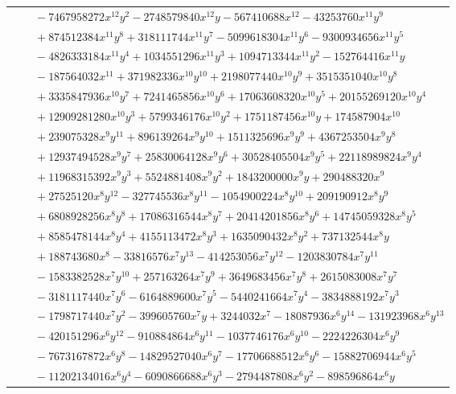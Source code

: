 \documentclass[11pt]{article}
\begin{document}
\begin{longtable}{@{}ll@{}}
 & $\quad -7467958272x^{12}y^{2}-2748579840x^{12}y-567410688x^{12}-43253760x^{11}y^{9}$\\
 & $\quad +874512384x^{11}y^{8}+318111744x^{11}y^{7}-5099618304x^{11}y^{6}-9300934656x^{11}y^{5}$\\
 & $\quad -4826333184x^{11}y^{4}+1034551296x^{11}y^{3}+1094713344x^{11}y^{2}-152764416x^{11}y$\\
 & $\quad -187564032x^{11}+371982336x^{10}y^{10}+2198077440x^{10}y^{9}+3515351040x^{10}y^{8}$\\
 & $\quad +3335847936x^{10}y^{7}+7241465856x^{10}y^{6}+17063608320x^{10}y^{5}+20155269120x^{10}y^{4}$\\
 & $\quad +12909281280x^{10}y^{3}+5799346176x^{10}y^{2}+1751187456x^{10}y+174587904x^{10}$\\
 & $\quad +239075328x^{9}y^{11}+896139264x^{9}y^{10}+1511325696x^{9}y^{9}+4367253504x^{9}y^{8}$\\
 & $\quad +12937494528x^{9}y^{7}+25830064128x^{9}y^{6}+30528405504x^{9}y^{5}+22118989824x^{9}y^{4}$\\
 & $\quad +11968315392x^{9}y^{3}+5524881408x^{9}y^{2}+1843200000x^{9}y+290488320x^{9}$\\
 & $\quad +27525120x^{8}y^{12}-327745536x^{8}y^{11}-1054900224x^{8}y^{10}+209190912x^{8}y^{9}$\\
 & $\quad +6808928256x^{8}y^{8}+17086316544x^{8}y^{7}+20414201856x^{8}y^{6}+14745059328x^{8}y^{5}$\\
 & $\quad +8585478144x^{8}y^{4}+4155113472x^{8}y^{3}+1635090432x^{8}y^{2}+737132544x^{8}y$\\
 & $\quad +188743680x^{8}-33816576x^{7}y^{13}-414253056x^{7}y^{12}-1203830784x^{7}y^{11}$\\
 & $\quad -1583382528x^{7}y^{10}+257163264x^{7}y^{9}+3649683456x^{7}y^{8}+2615083008x^{7}y^{7}$\\
 & $\quad -3181117440x^{7}y^{6}-6164889600x^{7}y^{5}-5440241664x^{7}y^{4}-3834888192x^{7}y^{3}$\\
 & $\quad -1798717440x^{7}y^{2}-399605760x^{7}y+3244032x^{7}-18087936x^{6}y^{14}-131923968x^{6}y^{13}$\\
 & $\quad -420151296x^{6}y^{12}-910884864x^{6}y^{11}-1037746176x^{6}y^{10}-2224226304x^{6}y^{9}$\\
 & $\quad -7673167872x^{6}y^{8}-14829527040x^{6}y^{7}-17706688512x^{6}y^{6}-15882706944x^{6}y^{5}$\\
 & $\quad -11202134016x^{6}y^{4}-6090866688x^{6}y^{3}-2794487808x^{6}y^{2}-898596864x^{6}y$\\

\end{longtable}
\end{document}
